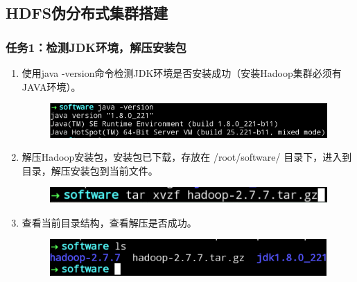 \documentclass {article}
\begin{document}
		\subsection{HDFS伪分布式集群搭建}
			\subsubsection{任务1：检测JDK环境，解压安装包}
				\begin{enumerate}
					\item 使用java -version命令检测JDK环境是否安装成功（安装Hadoop集群必须有JAVA环境）。
						\begin{figure}[H]
							\centering
							\includegraphics[width=4.5in]{figures/fig17.png}
						\end{figure}
					
					\item 解压Hadoop安装包，安装包已下载，存放在 /root/software/ 目录下，进入到目录，解压安装包到当前文件。
						\begin{figure}[H]
							\centering
							\includegraphics{figures/fig18.png}
						\end{figure}
					
					\item 查看当前目录结构，查看解压是否成功。
						\begin{figure}[H]
							\centering
							\includegraphics{figures/fig19.jpg}
						\end{figure}
				\end{enumerate}
		
\end{document}
